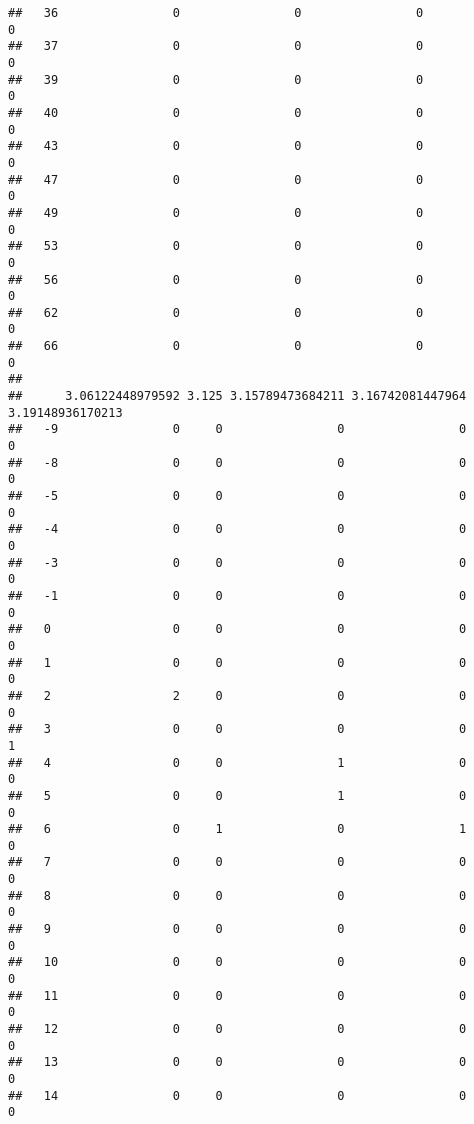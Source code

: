 \documentclass[]{article}
\begin{document}
\begin{verbatim}
##   36                0                0                0                0
##   37                0                0                0                0
##   39                0                0                0                0
##   40                0                0                0                0
##   43                0                0                0                0
##   47                0                0                0                0
##   49                0                0                0                0
##   53                0                0                0                0
##   56                0                0                0                0
##   62                0                0                0                0
##   66                0                0                0                0
##     
##      3.06122448979592 3.125 3.15789473684211 3.16742081447964 3.19148936170213
##   -9                0     0                0                0                0
##   -8                0     0                0                0                0
##   -5                0     0                0                0                0
##   -4                0     0                0                0                0
##   -3                0     0                0                0                0
##   -1                0     0                0                0                0
##   0                 0     0                0                0                0
##   1                 0     0                0                0                0
##   2                 2     0                0                0                0
##   3                 0     0                0                0                1
##   4                 0     0                1                0                0
##   5                 0     0                1                0                0
##   6                 0     1                0                1                0
##   7                 0     0                0                0                0
##   8                 0     0                0                0                0
##   9                 0     0                0                0                0
##   10                0     0                0                0                0
##   11                0     0                0                0                0
##   12                0     0                0                0                0
##   13                0     0                0                0                0
##   14                0     0                0                0                0

\end{verbatim}
\end{document}

